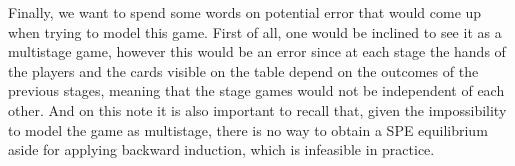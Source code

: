 Finally, we want to spend some words on potential error that would come up when trying to model this game.
First of all, one would be inclined to see it as a multistage game, however this would be an error since at each stage the hands of the players and the cards visible on the table depend on the outcomes of the previous stages, meaning that the stage games would not be independent of each other.
And on this note it is also important to recall that, given the impossibility to model the game as multistage, there is no way to obtain a SPE equilibrium aside for applying backward induction, which is infeasible in practice.
